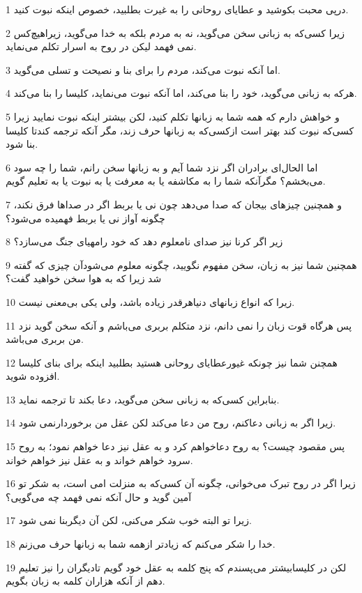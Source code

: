 \par 1 در‌پی محبت بکوشید و عطایای روحانی را به غیرت بطلبید، خصوص اینکه نبوت کنید.
\par 2 زیرا کسی‌که به زبانی سخن می‌گوید، نه به مردم بلکه به خدا می‌گوید، زیراهیچ‌کس نمی فهمد لیکن در روح به اسرار تکلم می‌نماید.
\par 3 اما آنکه نبوت می‌کند، مردم را برای بنا و نصیحت و تسلی می‌گوید.
\par 4 هرکه به زبانی می‌گوید، خود را بنا می‌کند، اما آنکه نبوت می‌نماید، کلیسا را بنا می‌کند.
\par 5 و خواهش دارم که همه شما به زبانها تکلم کنید، لکن بیشتر اینکه نبوت نمایید زیرا کسی‌که نبوت کند بهتر است ازکسی‌که به زبانها حرف زند، مگر آنکه ترجمه کندتا کلیسا بنا شود.
\par 6 اما الحال‌ای برادران اگر نزد شما آیم و به زبانها سخن رانم، شما را چه سود می‌بخشم؟ مگرآنکه شما را به مکاشفه یا به معرفت یا به نبوت یا به تعلیم گویم.
\par 7 و همچنین چیزهای بیجان که صدا می‌دهد چون نی یا بربط اگر در صداها فرق نکند، چگونه آواز نی یا بربط فهمیده می‌شود؟
\par 8 زیر اگر کرنا نیز صدای نامعلوم دهد که خود رامهیای جنگ می‌سازد؟
\par 9 همچنین شما نیز به زبان، سخن مفهوم نگویید، چگونه معلوم می‌شودآن چیزی که گفته شد زیرا که به هوا سخن خواهید گفت؟
\par 10 زیرا که انواع زبانهای دنیاهرقدر زیاده باشد، ولی یکی بی‌معنی نیست.
\par 11 پس هرگاه قوت زبان را نمی دانم، نزد متکلم بربری می‌باشم و آنکه سخن گوید نزد من بربری می‌باشد.
\par 12 همچنن شما نیز چونکه غیورعطایای روحانی هستید بطلبید اینکه برای بنای کلیسا افزوده شوید.
\par 13 بنابراین کسی‌که به زبانی سخن می‌گوید، دعا بکند تا ترجمه نماید.
\par 14 زیرا اگر به زبانی دعاکنم، روح من دعا می‌کند لکن عقل من برخوردارنمی شود.
\par 15 پس مقصود چیست؟ به روح دعاخواهم کرد و به عقل نیز دعا خواهم نمود؛ به روح سرود خواهم خواند و به عقل نیز خواهم خواند.
\par 16 زیرا اگر در روح تبرک می‌خوانی، چگونه آن کسی‌که به منزلت امی است، به شکر تو آمین گوید و حال آنکه نمی فهمد چه می‌گویی؟
\par 17 زیرا تو البته خوب شکر می‌کنی، لکن آن دیگربنا نمی شود.
\par 18 خدا را شکر می‌کنم که زیادتر ازهمه شما به زبانها حرف می‌زنم.
\par 19 لکن در کلیسابیشتر می‌پسندم که پنج کلمه به عقل خود گویم تادیگران را نیز تعلیم دهم از آنکه هزاران کلمه به زبان بگویم.
